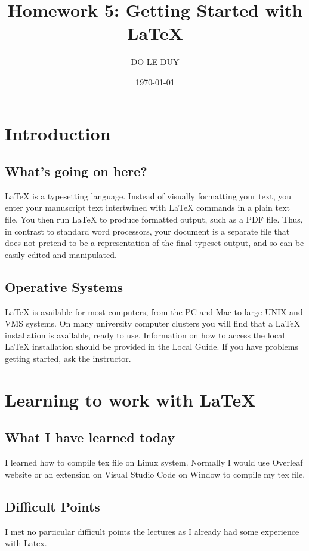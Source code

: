 \documentclass[11pt]{article}
\title{Homework 5: Getting Started with LaTeX}
\author{DO LE DUY}
\date{\today}
\begin{document}
\twocolumn
\maketitle
\section{Introduction} %
\subsection{What’s going on here?} %
LaTeX is a typesetting language. Instead of visually formatting your text, you enter your manuscript text intertwined with LaTeX commands in a plain text file. You then run LaTeX to produce formatted output, such as a PDF file. Thus, in contrast to standard word processors, your document is a separate file that does not pretend to be a representation of the final typeset output, and so can be easily edited and manipulated.
\subsection{Operative Systems} %
LaTeX is available for most computers, from the PC and Mac to large UNIX and VMS systems. On many university computer clusters you will find that a LaTeX installation is available, ready to use. Information on how to access the local LaTeX installation should be provided in the Local Guide. If you have problems getting started, ask the instructor.


\section{Learning to work with LaTeX} %
\subsection{What I have learned today} %
I learned how to compile tex file on Linux system. Normally I would use Overleaf website or an extension on Visual Studio Code on Window to compile my tex file. 
\subsection{Difficult Points} %
I met no particular difficult points the lectures as I already had some experience with Latex. 
\onecolumn
\end{document}
